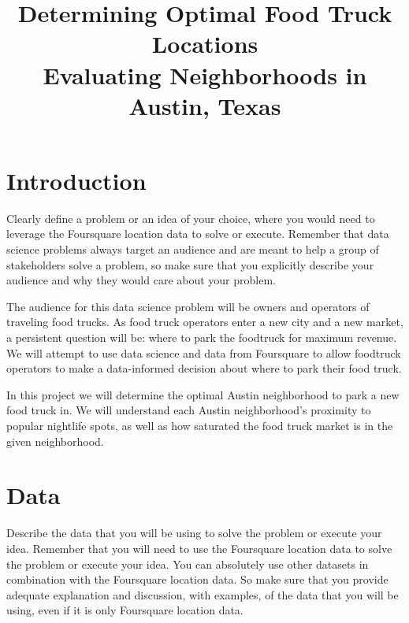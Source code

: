 \documentclass{deagle}
\title{Determining Optimal Food Truck Locations \\ \Large Evaluating Neighborhoods in Austin, Texas}
\begin{document}
\maketitle


\section*{Introduction}

\begin{question}
    Clearly define a problem or an idea of your choice, where you would need to leverage the Foursquare location data to solve or execute. Remember that data science problems always target an audience and are meant to help a group of stakeholders solve a problem, so make sure that you explicitly describe your audience and why they would care about your problem.
\end{question}

The audience for this data science problem will be owners and operators of traveling food trucks. As food truck operators enter a new city and a new market, a persistent question will be: where to park the foodtruck for maximum revenue. We will attempt to use data science and data from Foursquare to allow foodtruck operators to make a data-informed decision about where to park their food truck.

In this project we will determine the optimal Austin neighborhood to park a new food truck in. We will understand each Austin neighborhood's proximity to popular nightlife spots, as well as how saturated the food truck market is in the given neighborhood.

\section*{Data}

\begin{question}
    Describe the data that you will be using to solve the problem or execute your idea. Remember that you will need to use the Foursquare location data to solve the problem or execute your idea. You can absolutely use other datasets in combination with the Foursquare location data. So make sure that you provide adequate explanation and discussion, with examples, of the data that you will be using, even if it is only Foursquare location data.
\end{question}
\end{document}
